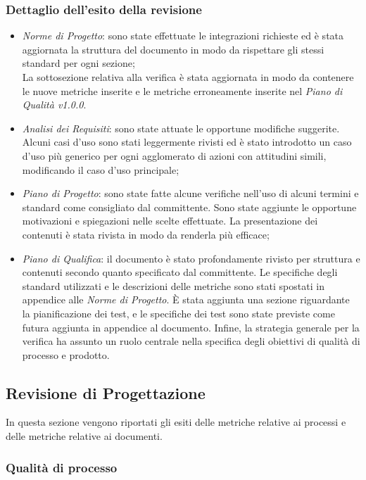 \subsubsection{Dettaglio dell'esito della revisione}
\begin{itemize}
	\item\emph{Norme di Progetto}: sono state effettuate le integrazioni richieste ed è stata aggiornata la struttura del documento in modo da rispettare gli stessi standard per ogni sezione;\\
	La sottosezione relativa alla verifica è stata aggiornata in modo da contenere le nuove metriche inserite e le metriche erroneamente inserite nel \emph{Piano di Qualità v1.0.0}.	\item\emph{Analisi dei Requisiti}: sono state attuate le opportune modifiche suggerite. Alcuni casi d'uso sono stati leggermente rivisti ed è stato introdotto un caso d'uso più generico per ogni agglomerato di azioni con attitudini simili, modificando il caso d'uso principale; 	
	\item\emph{Piano di Progetto}: sono state fatte alcune verifiche nell'uso di alcuni termini e standard come consigliato dal committente. Sono state aggiunte le opportune motivazioni e spiegazioni nelle scelte effettuate. La presentazione dei contenuti è stata rivista in modo da renderla più efficace;
	\item\emph{Piano di Qualifica}: il documento è stato profondamente rivisto per struttura e contenuti secondo quanto specificato dal committente.
	Le specifiche degli standard utilizzati e le descrizioni delle metriche sono stati spostati in appendice alle \emph{Norme di Progetto}. È stata aggiunta una sezione riguardante la pianificazione dei test, e le specifiche dei test sono state previste come futura aggiunta in appendice al documento. Infine, la strategia generale per la verifica ha assunto un ruolo centrale nella specifica degli obiettivi di qualità di processo e prodotto. 
\end{itemize}

\subsection{Revisione di Progettazione}
In questa sezione vengono riportati gli esiti delle metriche relative ai processi e delle metriche relative ai documenti.

\subsubsection{Qualità di processo}
